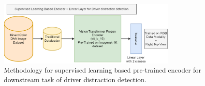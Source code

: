 \begin{figure}[h]
\begin{center}
\includegraphics[width=0.8\textwidth]{Images_Thesis/methodology_images/methodology_flowchart_d_a_without_augmentation_final_2.png}
\end{center}
\caption[Methodology for supervised learning based pre-trained encoder for downstream task of driver distraction detection.]{Methodology for supervised learning based pre-trained encoder for downstream task of driver distraction detection.}
\label{fig:method_flow_chart_d_a_without_aug}
\end{figure}

